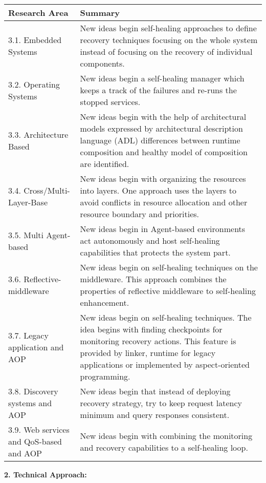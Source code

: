 \begin{center}
    \begin{tabular}{ | l | p{6cm} |}
    \hline
    Research Area & Summary \\ \hline
    3.1. Embedded Systems & New ideas begin self-healing approaches to define recovery techniques focusing on the whole system instead of focusing on the recovery of individual components. \\ \hline
    3.2. Operating Systems & New ideas begin a self-healing manager which keeps a track of the failures and re-runs the stopped services.
 \\ \hline
    3.3. Architecture Based &New ideas begin with the help of architectural models expressed by architectural description language (ADL) differences between runtime composition and healthy model of composition are identified. \\
    \hline
    3.4. Cross/Multi-Layer-Base & New ideas begin with organizing the resources into layers. One approach uses the layers to avoid conflicts in resource allocation and other resource boundary and priorities.  \\ \hline
        3.5. Multi Agent-based & New ideas begin in Agent-based environments act autonomously and host self-healing capabilities that protects the system part. 
 \\ \hline
     3.6. Reflective-middleware & New ideas begin on self-healing techniques on the middleware. This approach combines the properties of reflective middleware to self-healing enhancement.
 \\ \hline
      3.7. Legacy application and AOP & New ideas begin on self-healing techniques. The idea begins with finding checkpoints for monitoring recovery actions. This feature is provided by linker, runtime for legacy applications or implemented by aspect-oriented programming.
 \\ \hline
  3.8. Discovery systems and AOP & New ideas begin that instead of deploying recovery strategy, try to keep request latency minimum and query responses consistent.
  \\ \hline
   3.9. Web services and QoS-based and AOP & New ideas begin with combining the monitoring and recovery capabilities to a self-healing loop. 
    \end{tabular}
\end{center}





\textbf{2. Technical Approach:\\}

